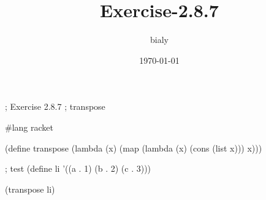 \documentclass[11pt]{article}
\author{bialy}
\date{\today}
\title{Exercise-2.8.7}
\begin{document}
\maketitle
\tableofcontents

; Exercise 2.8.7
; transpose

\#lang racket

(define transpose
  (lambda (x)
    (map (lambda (x)
           (cons (list x)))
         x)))


; test
(define li '((a . 1) (b . 2) (c . 3)))

(transpose li)
\end{document}
